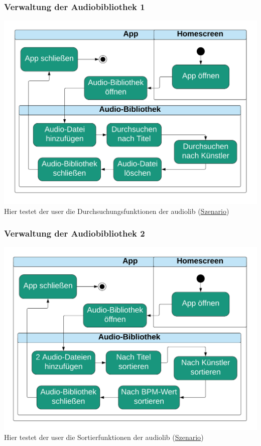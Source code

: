 \documentclass[../pflichtenheft.tex]{subfiles}
\begin{document}
		\subsubsection{Verwaltung der Audiobibliothek 1}
		\label{sec:verwaltung1}
			\includegraphics[page=1,width=400pt,keepaspectratio]{../graphics/UML/Verwaltung_der_Audio-Bibliothek_1.png}
			Hier testet der \Gls{user} die Durchsuchungsfunktionen der \Gls{audiolib} (\hyperref[sec:verwaltung1S]{Szenario})
		\subsubsection{Verwaltung der Audiobibliothek 2}
		\label{sec:verwaltung2}
			\includegraphics[page=1,width=400pt,keepaspectratio]{../graphics/UML/Verwaltung_der_Audio-Bibliothek_2.png}
			Hier testet der \Gls{user} die Sortierfunktionen der \Gls{audiolib} (\hyperref[sec:verwaltung2S]{Szenario})
\end{document}
